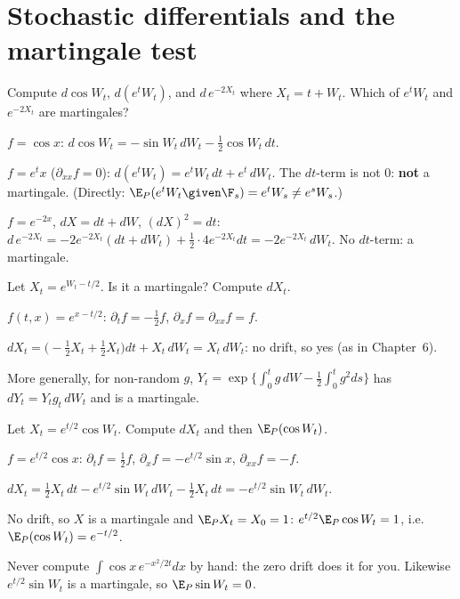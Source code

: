 \section{Stochastic differentials and the martingale test}

\begin{problem}
Compute $d\cos W_t$, $d(e^tW_t)$, and $d\,e^{-2X_t}$ where $X_t=t+W_t$. Which of $e^tW_t$ and $e^{-2X_t}$ are martingales?
\begin{steps}
  \item $f=\cos x$: $d\cos W_t=-\sin W_t\,dW_t-\frac12\cos W_t\,dt$.
  \item $f=e^tx$ ($\partial_{xx}f=0$): $d(e^tW_t)=e^tW_t\,dt+e^t\,dW_t$. The $dt$-term is not $0$: \textbf{not} a martingale. (Directly: $\E_P(e^tW_t\given\F_s)=e^tW_s\ne e^sW_s$.)
  \item $f=e^{-2x}$, $dX=dt+dW$, $(dX)^2=dt$: $d\,e^{-2X_t}=-2e^{-2X_t}(dt+dW_t)+\frac12\cdot4e^{-2X_t}dt=-2e^{-2X_t}\,dW_t$. No $dt$-term: a martingale.
\end{steps}
\end{problem}

\begin{problem}
Let $X_t=e^{W_t-t/2}$. Is it a martingale? Compute $dX_t$.
\begin{steps}
  \item $f(t,x)=e^{x-t/2}$: $\partial_tf=-\frac12f$, $\partial_xf=\partial_{xx}f=f$.
  \item $dX_t=\big(-\frac12X_t+\frac12X_t\big)dt+X_t\,dW_t=X_t\,dW_t$: no drift, so yes (as in Chapter~6).
\end{steps}
More generally, for non-random $g$, $Y_t=\exp\big\{\int_0^tg\,dW-\frac12\int_0^tg^2ds\big\}$ has $dY_t=Y_tg_t\,dW_t$ and is a martingale.
\end{problem}

\begin{problem}
Let $X_t=e^{t/2}\cos W_t$. Compute $dX_t$ and then $\E_P(\cos W_t)$.
\begin{steps}
  \item $f=e^{t/2}\cos x$: $\partial_tf=\frac12f$, $\partial_xf=-e^{t/2}\sin x$, $\partial_{xx}f=-f$.
  \item $dX_t=\frac12X_t\,dt-e^{t/2}\sin W_t\,dW_t-\frac12X_t\,dt=-e^{t/2}\sin W_t\,dW_t$.
  \item No drift, so $X$ is a martingale and $\E_PX_t=X_0=1$: $e^{t/2}\E_P\cos W_t=1$, i.e.\ $\E_P(\cos W_t)=e^{-t/2}$.
\end{steps}
Never compute $\int\cos x\,e^{-x^2/2t}dx$ by hand: the zero drift does it for you. Likewise $e^{t/2}\sin W_t$ is a martingale, so $\E_P\sin W_t=0$.
\end{problem}

